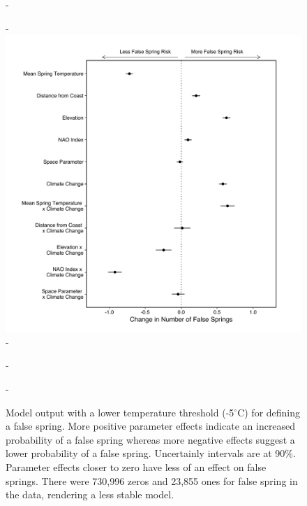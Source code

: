 \documentclass{article}\usepackage[]{graphicx}\usepackage[]{color}
\begin{document}
{\begin{figure} [H]
  -\begin{center}
  -\includegraphics[width=12cm]{..//figures/model_output_five_90.pdf}
  -\caption{Model output with a lower temperature threshold (-5$^{\circ}$C) for defining a false spring. More positive parameter effects indicate an increased probability of a false spring whereas more negative effects suggest a lower probability of a false spring. Uncertainly intervals are at 90\%. Parameter effects closer to zero have less of an effect on false springs. There were 730,996 zeros and 23,855 ones for false spring in the data, rendering a less stable model. }\label{fig:five}
  -\end{center}
  -\end{figure}}
  
\end{document}
